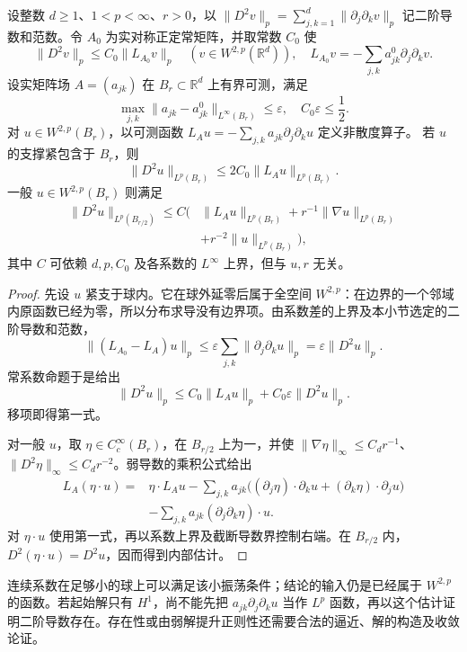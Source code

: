 \begin{proposition}[冻结系数的先验估计]\label{b2:prop:22-freezing-estimate}
设整数 \(d\geq1\)、\(1<p<\infty\)、\(r>0\)，以
\(\|D^2v\|_p=\sum_{j,k=1}^d\|\partial_j\partial_kv\|_p\)
记二阶导数和范数。令 \(A_0\) 为实对称正定常矩阵，并取常数 \(C_0\) 使
\[
 \|D^2v\|_p\leq C_0\|L_{A_0}v\|_p
 \quad(v\in W^{2,p}(\mathbb R^d)),\quad
 L_{A_0}v=-\sum_{j,k}a_{jk}^0\partial_j\partial_kv.
\]
设实矩阵场 \(A=(a_{jk})\) 在 \(B_r\subset\mathbb R^d\) 上有界可测，满足
\[
 \max_{j,k}\|a_{jk}-a_{jk}^0\|_{L^\infty(B_r)}
 \leq\varepsilon,\quad C_0\varepsilon\leq\frac12.
\]
对 \(u\in W^{2,p}(B_r)\)，以可测函数
\(L_Au=-\sum_{j,k}a_{jk}\partial_j\partial_ku\) 定义非散度算子。
若 \(u\) 的支撑紧包含于 \(B_r\)，则
\[
 \|D^2u\|_{L^p(B_r)}\leq2C_0\|L_Au\|_{L^p(B_r)}.
\]
一般 \(u\in W^{2,p}(B_r)\) 则满足
\[
 \begin{aligned}
 \|D^2u\|_{L^p(B_{r/2})}
 \leq C\bigl(&\|L_Au\|_{L^p(B_r)}
       +r^{-1}\|\nabla u\|_{L^p(B_r)}\\
       &+r^{-2}\|u\|_{L^p(B_r)}\bigr),
 \end{aligned}
\]
其中 \(C\) 可依赖 \(d,p,C_0\) 及各系数的 \(L^\infty\) 上界，但与 \(u,r\) 无关。
\end{proposition}
\begin{proof}
先设 \(u\) 紧支于球内。它在球外延零后属于全空间 \(W^{2,p}\)：在边界的一个邻域内原函数已经为零，所以分布求导没有边界项。由系数差的上界及本小节选定的二阶导数和范数，
\[
 \|(L_{A_0}-L_A)u\|_p
 \leq\varepsilon\sum_{j,k}\|\partial_j\partial_ku\|_p
 =\varepsilon\|D^2u\|_p.
\]
常系数命题于是给出
\[
 \|D^2u\|_p
 \leq C_0\|L_Au\|_p+C_0\varepsilon\|D^2u\|_p.
\]
移项即得第一式。

对一般 \(u\)，取 \(\eta\in C_c^\infty(B_r)\)，在 \(B_{r/2}\) 上为一，并使
\(\|\nabla\eta\|_\infty\leq C_dr^{-1}\)、
\(\|D^2\eta\|_\infty\leq C_dr^{-2}\)。弱导数的乘积公式给出
\[
 \begin{aligned}
 L_A(\eta\cdot u)
 ={}&\eta\cdot L_Au
 -\sum_{j,k}a_{jk}
       \bigl((\partial_j\eta)\cdot\partial_ku
              +(\partial_k\eta)\cdot\partial_ju\bigr)\\
 &-\sum_{j,k}a_{jk}(\partial_j\partial_k\eta)\cdot u.
 \end{aligned}
\]
对 \(\eta\cdot u\) 使用第一式，再以系数上界及截断导数界控制右端。在
\(B_{r/2}\) 内，\(D^2(\eta\cdot u)=D^2u\)，因而得到内部估计。
\end{proof}
连续系数在足够小的球上可以满足该小振荡条件；结论的输入仍是已经属于 \(W^{2,p}\) 的函数。若起始解只有 \(H^1\)，尚不能先把
\(a_{jk}\partial_j\partial_ku\) 当作 \(L^p\) 函数，再以这个估计证明二阶导数存在。存在性或由弱解提升正则性还需要合法的逼近、解的构造及收敛论证。

